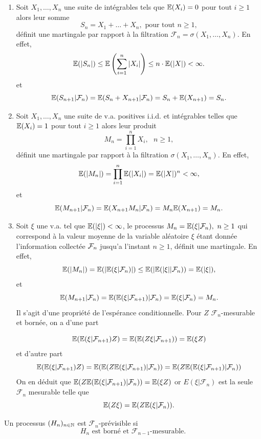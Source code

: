 \begin{ex}
\begin{enumerate}
    \item Soit $X_1,\ldots, X_n$ une suite de \va \iid  intégrables tels que $\mathbb{E}(X_i) = 0$ pour tout $i\geq 1$ alors leur somme
    $$
    S_n = X_1+\ldots+X_n,\text{ pour tout }n\geq1,
    $$
    définit une martingale par rapport à la filtration $\mathcal{F}_n = \sigma(X_1,\ldots, X_n)$. En effet,
    $$
    \mathbb{E}(|S_n|)\leq \mathbb{E}\left(\sum_{i=1}^n|X_i|\right)\leq n\cdot\mathbb{E}(|X|) <\infty.
    $$
    et
    $$
    \mathbb{E}(S_{n+1}|\mathcal{F}_n) =\mathbb{E}(S_{n}+X_{n+1}|\mathcal{F}_n) = S_n + \mathbb{E}(X_{n+1}) = S_n.
    $$
    
    \item Soit $X_1,\ldots, X_n$ une suite de v.a. positives i.i.d. et intégrables telles que $\mathbb{E}(X_i) = 1$ pour tout $i\geq 1$ alors leur produit
    $$
    M_n = \prod_{i=1}^n X_i,\text{ }n\geq1,
    $$
    définit une martingale par rapport à la filtration $\sigma(X_1,\ldots, X_n)$. En effet,
    $$
\mathbb{E}(|M_n|) = \prod_{i=1}^n\mathbb{E}(|X_i|) = \mathbb{E}(|X|)^n <\infty,
    $$
    et
    $$
    \mathbb{E}(M_{n+1}|\mathcal{F}_n) =\mathbb{E}(X_{n+1}M_n|\mathcal{F}_n) = M_n\mathbb{E}(X_{n+1}) = M_n.
    $$
    \item Soit $\xi$ une v.a. tel que $\mathbb{E}(|\xi|)<\infty$, le processus $M_n = \mathbb{E}(\xi|\mathcal{F}_n),\text{ }n\geq1$ qui correspond à la valeur moyenne de la variable aléatoire $\xi$ étant donnée l'information collectée $\mathcal{F}_n$ jusqu'a l'instant $n\geq1$, définit une martingale. En effet, 
    $$
\mathbb{E}(|M_n|) = \mathbb{E}(|\mathbb{E}(\xi|\mathcal{F}_n)|) \leq \mathbb{E}(|\mathbb{E}(|\xi||\mathcal{F}_n)) = \mathbb{E}(|\xi|),
    $$
    et
    $$
    \mathbb{E}(M_{n+1}|\mathcal{F}_n) = \mathbb{E}(\mathbb{E}(\xi|\mathcal{F}_{n+1})|\mathcal{F}_n) =\mathbb{E}(\xi|\mathcal{F}_n) = M_n.
    $$
    Il s'agit d'une propriété de l'espérance conditionnelle. Pour $Z$ $\mathcal{F}_n$-mesurable et bornée, on a d'une part 
    
    $$
    \mathbb{E}(\mathbb{E}(\xi|\mathcal{F}_{n+1})Z)=\mathbb{E}(\mathbb{E}(Z\xi|\mathcal{F}_{n+1})) = \mathbb{E}(\xi Z)
    $$
    et d'autre part
    $$
    \mathbb{E}(\mathbb{E}(\xi|\mathcal{F}_{n+1})Z)=\mathbb{E}(\mathbb{E}(Z\mathbb{E}(\xi|\mathcal{F}_{n+1})|\mathcal{F}_n)) =  \mathbb{E}(Z\mathbb{E}(\mathbb{E}(\xi|\mathcal{F}_{n+1})|\mathcal{F}_n))
    $$
    On en déduit que $\mathbb{E}(Z\mathbb{E}(\mathbb{E}(\xi|\mathcal{F}_{n+1})|\mathcal{F}_n)) = \mathbb{E}(\xi Z)$ or $E(\xi|\mathcal{F}_{n})$ est la seule \va $\mathcal{F}_n$ mesurable telle que 
    $$
    \mathbb{E}(Z\xi) = \mathbb{E}(Z\mathbb{E}(\xi|\mathcal{F}_n)).
    $$
\end{enumerate}
\end{ex}
\begin{definition}
Un processus $(H_n)_{n\in\mathbb{N}}$ est $\mathcal{F}_n$-prévisible si
$$
H_n\text{ est borné et }\mathcal{F}_{n-1}\text{-mesurable}.
$$
\end{definition}
